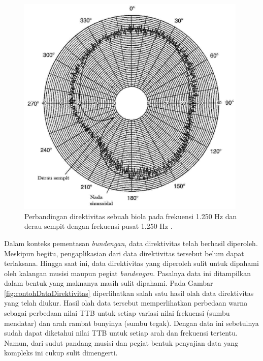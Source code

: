 \begin{figure}[t!]
    \centering
    \includegraphics[width=11cm]{Gambar/diagramPolarBiola.jpg}
    \caption{Perbandingan direktivitas sebuah biola pada frekuensi 1.250 Hz dan derau sempit dengan frekuensi pusat 1.250 Hz \cite{meyer}.}
    \label{fig:diagramPolarBiola}
\end{figure}
\newpage
Dalam konteks pementasan \textit{bundengan}, data direktivitas telah berhasil diperoleh. Meskipun begitu, pengaplikasian dari data direktivitas tersebut belum dapat terlaksana. Hingga saat ini, data direktivitas yang diperoleh sulit untuk dipahami oleh kalangan musisi maupun pegiat \textit{bundengan}. Pasalnya data ini ditampilkan dalam bentuk yang maknanya masih sulit dipahami. Pada Gambar \ref{fig:contohDataDirektivitas} diperlihatkan salah satu hasil olah data direktivitas \bundengan yang telah diukur. Hasil olah data tersebut memperlihatkan perbedaan warna sebagai perbedaan nilai TTB untuk setiap variasi nilai frekuensi (sumbu mendatar) dan arah rambat bunyinya (sumbu tegak). Dengan data ini sebetulnya sudah dapat diketahui nilai TTB untuk setiap arah dan frekuensi tertentu. Namun, dari sudut pandang musisi dan pegiat \bundengan bentuk penyajian data yang kompleks ini cukup sulit dimengerti. \par 
